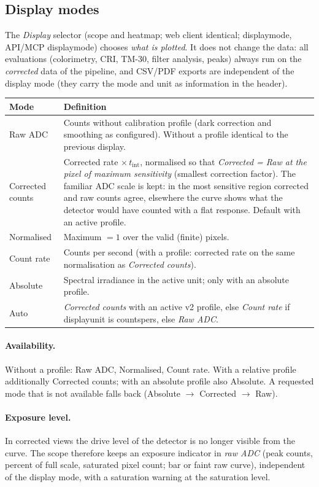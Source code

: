 \documentclass[12pt,a4paper]{article}
\DeclareRobustCommand{\code}[1]{{\ttfamily\small\def\_{\rawus\allowbreak}#1}}
\DeclareRobustCommand{\key}[1]{{\ttfamily\small\color{acc2}\def\_{\rawus\allowbreak}#1}}
\begin{document}
\subsection{Display modes}\label{sec:displaymodes}
The \emph{Display} selector (scope and heatmap; web client identical;
\key{display\_mode}, API/MCP \code{display\_mode}) chooses \emph{what is plotted}.
It does not change the data: all evaluations (colorimetry, CRI, TM-30, filter
analysis, peaks) always run on the \emph{corrected} data of the pipeline, and
CSV/PDF exports are independent of the display mode (they carry the mode and
unit as information in the header).
\begin{longtable}{@{}p{2.9cm}p{11.3cm}@{}}
\toprule \textbf{Mode} & \textbf{Definition}\\ \midrule\endhead
Raw ADC & Counts without calibration profile (dark correction and smoothing as
  configured). Without a profile identical to the previous display.\\
Corrected counts & Corrected rate $\times\,t_{\mathrm{int}}$, normalised so that
  \emph{Corrected = Raw at the pixel of maximum sensitivity} (smallest correction
  factor). The familiar ADC scale is kept: in the most sensitive region corrected
  and raw counts agree, elsewhere the curve shows what the detector would have
  counted with a flat response. Default with an active profile.\\
Normalised & Maximum $=1$ over the valid (finite) pixels.\\
Count rate & Counts per second (with a profile: corrected rate on the same
  normalisation as \emph{Corrected counts}).\\
Absolute & Spectral irradiance in the active unit; only with an absolute profile.\\
Auto & \emph{Corrected counts} with an active v2 profile, else \emph{Count rate}
  if \key{display\_unit} is \code{counts\_per\_s}, else \emph{Raw ADC}.\\
\bottomrule
\end{longtable}
\paragraph{Availability.} Without a profile: Raw ADC, Normalised, Count rate.
With a relative profile additionally Corrected counts; with an absolute profile
also Absolute. A requested mode that is not available falls back (Absolute
$\to$ Corrected $\to$ Raw).

\paragraph{Exposure level.} In corrected views the drive level of the detector
is no longer visible from the curve. The scope therefore keeps an exposure
indicator in \emph{raw ADC} (peak counts, percent of full scale, saturated pixel
count; bar or faint raw curve), independent of the display mode, with a
saturation warning at the saturation level.
\end{document}
